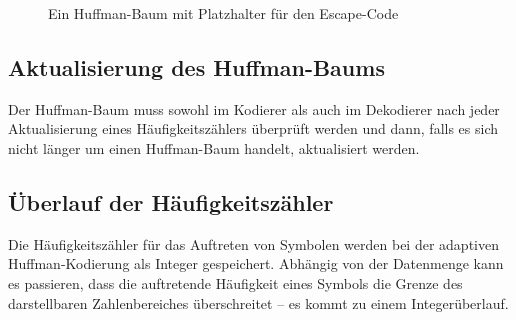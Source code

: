 \documentclass[twoside,11pt,a4paper]{article}
\theoremstyle{break}
\begin{document}
\begin{figure}[h]
\centering
{}
\caption{Ein Huffman-Baum mit Platzhalter für den Escape-Code} \label{fig:HESC}
\end{figure}


\subsection{Aktualisierung des Huffman-Baums}
Der Huffman-Baum muss sowohl im Kodierer als auch im Dekodierer nach
jeder Aktualisierung eines Häufigkeitszählers überprüft werden und
dann, falls es sich nicht länger um einen Huffman-Baum handelt,
aktualisiert werden.

\subsection{Überlauf der Häufigkeitszähler}
Die Häufigkeitszähler für das Auftreten von Symbolen werden bei der
adaptiven Huffman-Kodierung als Integer gespeichert. Abhängig von der
Datenmenge kann es passieren, dass die auftretende Häufigkeit eines
Symbols die Grenze des darstellbaren Zahlenbereiches überschreitet --
es kommt zu einem Integerüberlauf.
\end{document}
